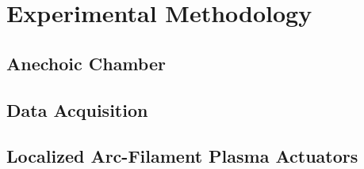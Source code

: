\chapter{Experimental Methodology}
\label{methodology}

\section{Anechoic Chamber}

\section{Data Acquisition}

\section{Localized Arc-Filament Plasma Actuators}